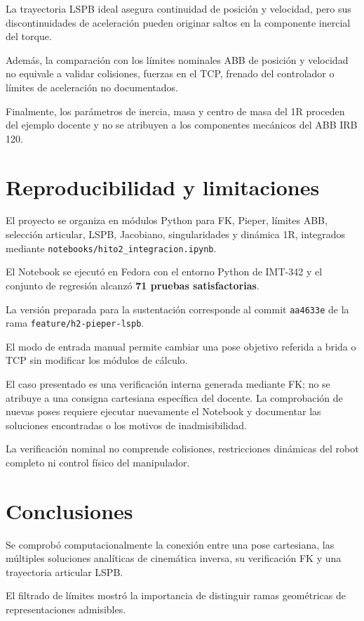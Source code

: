 \documentclass[conference]{IEEEtran}
\begin{document}
La trayectoria LSPB ideal asegura continuidad de posición y velocidad, pero sus discontinuidades de aceleración pueden originar saltos en la componente inercial del torque.

Además, la comparación con los límites nominales ABB de posición y velocidad no equivale a validar colisiones, fuerzas en el TCP, frenado del controlador o límites de aceleración no documentados.

Finalmente, los parámetros de inercia, masa y centro de masa del 1R proceden del ejemplo docente y no se atribuyen a los componentes mecánicos del ABB IRB 120.

\section{Reproducibilidad y limitaciones}

El proyecto se organiza en módulos Python para FK, Pieper, límites ABB, selección articular, LSPB, Jacobiano, singularidades y dinámica 1R, integrados mediante \texttt{notebooks/hito2\_integracion.ipynb}.

El Notebook se ejecutó en Fedora con el entorno Python de IMT-342 y el conjunto de regresión alcanzó \textbf{71 pruebas satisfactorias}.

La versión preparada para la sustentación corresponde al commit \texttt{aa4633e} de la rama \texttt{feature/h2-pieper-lspb}.

El modo de entrada manual permite cambiar una pose objetivo referida a brida o TCP sin modificar los módulos de cálculo.

El caso presentado es una verificación interna generada mediante FK; no se atribuye a una consigna cartesiana específica del docente. La comprobación de nuevas poses requiere ejecutar nuevamente el Notebook y documentar las soluciones encontradas o los motivos de inadmisibilidad.

La verificación nominal no comprende colisiones, restricciones dinámicas del robot completo ni control físico del manipulador.

\section{Conclusiones}

Se comprobó computacionalmente la conexión entre una pose cartesiana, las múltiples soluciones analíticas de cinemática inversa, su verificación FK y una trayectoria articular LSPB.

El filtrado de límites mostró la importancia de distinguir ramas geométricas de representaciones admisibles.
\end{document}
